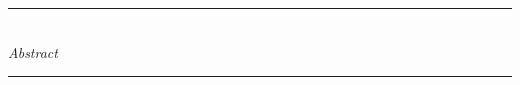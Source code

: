 \begin{center}
    \rule{4in}{0.4pt}\\[0.2cm]
    {\Large \textit{Abstract}}\vspace{-0.2cm}\\
    \rule{4in}{0.4pt}\\[1.5cm]
    
    {\large \thesisTitle}\\[1cm]
    
    {\yourName}\\[1cm]
    
    {\yourYear}
\end{center}
\vspace{1.8cm}

\abstractBody

